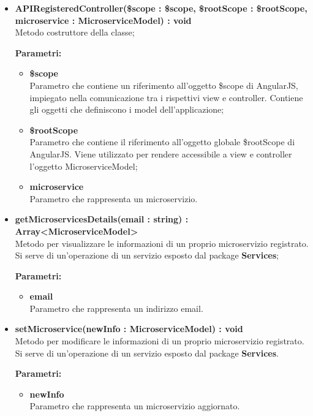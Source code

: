 \begin{itemize}
\begin{itemize}
			\item \textbf{APIRegisteredController(\$scope : \$scope, \$rootScope : \$rootScope, microservice : MicroserviceModel) : void}\\
			Metodo costruttore della classe;
			\begin{description}
    			\item[\textbf{Parametri:}]
			\end{description}
			\begin{itemize}
				\item \textbf{\$scope}\\
				Parametro che contiene un riferimento all'oggetto \$scope di AngularJS, impiegato nella comunicazione tra i rispettivi view e controller. Contiene gli oggetti che definiscono i model dell'applicazione;
				
				\item \textbf{\$rootScope}\\
				Parametro che contiene il riferimento all'oggetto globale \$rootScope di AngularJS. Viene utilizzato per rendere accessibile a view e controller l'oggetto MicroserviceModel;
				
				\item \textbf{microservice}\\
				Parametro che rappresenta un microservizio.
			\end{itemize}
			
			\item \textbf{getMicroservicesDetails(email : string) : Array<MicroserviceModel>}\\
			Metodo per visualizzare le informazioni di un proprio microservizio registrato. Si serve di un'operazione di un servizio esposto dal package \textbf{Services};
			\begin{description}
    			\item[\textbf{Parametri:}]
			\end{description}
			\begin{itemize}
				\item \textbf{email}\\
				Parametro che rappresenta un indirizzo email.
			\end{itemize}
			
			\item \textbf{setMicroservice(newInfo : MicroserviceModel) : void}\\
			Metodo per modificare le informazioni di un proprio microservizio registrato. Si serve di un'operazione di un servizio esposto dal package \textbf{Services}.
			\begin{description}
    			\item[\textbf{Parametri:}]
			\end{description}
			\begin{itemize}
				\item \textbf{newInfo}\\
				Parametro che rappresenta un microservizio aggiornato.
			\end{itemize}


\end{itemize}
\end{itemize}
